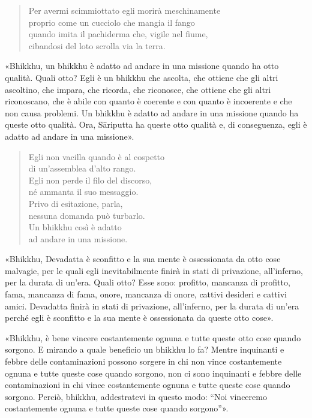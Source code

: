 \begin{quote}
Per avermi scimmiottato egli morirà meschinamente \\
proprio come un cucciolo che mangia il fango \\
quando imita il pachiderma che, vigile nel fiume, \\
cibandosi del loto scrolla via la terra.
\end{quote}



«Bhikkhu, un bhikkhu è adatto ad andare in una missione quando ha otto
qualità. Quali otto? Egli è un bhikkhu che ascolta, che ottiene che gli
altri ascoltino, che impara, che ricorda, che riconosce, che ottiene che
gli altri riconoscano, che è abile con quanto è coerente e con quanto è
incoerente e che non causa problemi. Un bhikkhu è adatto ad andare in
una missione quando ha queste otto qualità. Ora, Sāriputta ha queste
otto qualità e, di conseguenza, egli è adatto ad andare in una
missione».


\begin{quote}
Egli non vacilla quando è al cospetto \\
di un’assemblea d’alto rango. \\
Egli non perde il filo del discorso, \\
né ammanta il suo messaggio. \\
Privo di esitazione, parla, \\
nessuna domanda può turbarlo. \\
Un bhikkhu così è adatto \\
ad andare in una missione.
\end{quote}



«Bhikkhu, Devadatta è sconfitto e la sua mente è ossessionata da otto
cose malvagie, per le quali egli inevitabilmente finirà in stati di
privazione, all’inferno, per la durata di un’era. Quali otto? Esse sono:
profitto, mancanza di profitto, fama, mancanza di fama, onore, mancanza
di onore, cattivi desideri e cattivi amici. Devadatta finirà in stati di
privazione, all’inferno, per la durata di un’era perché egli è sconfitto
e la sua mente è ossessionata da queste otto cose».


«Bhikkhu, è bene vincere costantemente ognuna e tutte queste otto cose
quando sorgono. E mirando a quale beneficio un bhikkhu lo fa? Mentre
inquinanti e febbre delle contaminazioni possono sorgere in chi non
vince costantemente ognuna e tutte queste cose quando sorgono, non ci
sono inquinanti e febbre delle contaminazioni in chi vince costantemente
ognuna e tutte queste cose quando sorgono. Perciò, bhikkhu, addestratevi
in questo modo: “Noi vinceremo costantemente ognuna e tutte queste cose
quando sorgono”».


